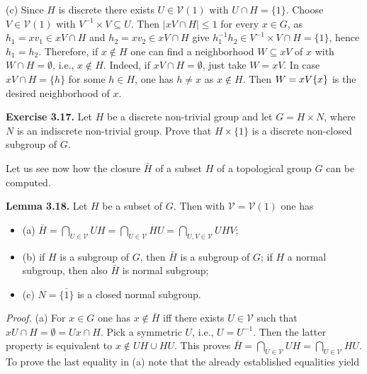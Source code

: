 \documentclass[12pt]{article}
\begin{document}
        (c) Since $H$ is discrete there exists $U \in \mathcal{V}(1)$ with $U \cap H = \{1\}$. Choose $V \in \mathcal{V}(1)$ with $V^{-1} \times V \subseteq U$. Then
        $|xV \cap H| \leq 1$ for every $x \in G$, as $h_1 = xv_1 \in xV \cap H$ and $h_2 = xv_2 \in xV \cap H$ give $h^{-1}_1 h_2 \in V^{-1} \times V \cap H = \{1\}$,
        hence $h_1 = h_2$. Therefore, if $x \notin H$ one can find a neighborhood $W \subseteq xV$ of $x$ with $W \cap H = \emptyset$, i.e., $x \notin H$.
        Indeed, if $xV \cap H = \emptyset$, just take $W = xV$. In case $xV \cap H = \{h\}$ for some $h \in H$, one has $h \neq x$ as $x \notin H$.
        Then $W = xV \\ \{x\}$ is the desired neighborhood of $x$.


    \textbf{Exercise 3.17.} Let $H$ be a discrete non-trivial group and let $G = H \times N$, where $N$ is an indiscrete non-trivial
    group. Prove that $H \times \{1\}$ is a discrete non-closed subgroup of $G$.
    
    
        Let us see now how the closure $\bar{H}$ of a subset $H$ of a topological group $G$ can be computed.
    

    \textbf{Lemma 3.18.} Let $H$ be a subset of $G$. Then with $\mathcal{V} = \mathcal{V}(1)$ one has

        \begin{itemize}

            \item (a) $\bar{H} = \bigcap_{U \in \mathcal{V}} UH = \bigcap_{U \in \mathcal{V}} HU = \bigcap_{U,V \in \mathcal{V}} UHV$;
            
            \item (b) if $H$ is a subgroup of $G$, then $\bar{H}$ is a subgroup of $G$; if $H$ a normal subgroup, then also $\bar{H}$ is normal subgroup;
            
            \item (c) $N = \bar{\{1\}}$ is a closed normal subgroup.

        \end{itemize}


        \emph{Proof.} (a) For $x \in G$ one has $x \notin \bar{H}$ iff there exists $U \in \mathcal{V}$ such that $xU \cap H = \emptyset = Ux \cap H$. Pick a symmetric $U$,
        i.e., $U = U^{-1}$. Then the latter property is equivalent to $x \notin UH \cup HU$. This proves $\bar{H} = \bigcap_{U \in \mathcal{V}} UH = \bigcap_{U \in \mathcal{V}} HU$.
        To prove the last equality in (a) note that the already established equalities yield
\end{document}
